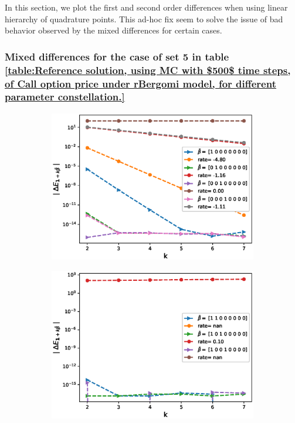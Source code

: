 \documentclass[11pt]{article}
\begin{document}
In this section, we plot the first and second order differences when using linear hierarchy of quadrature points. This ad-hoc fix seem to solve the issue of bad behavior observed by the mixed differences for certain cases.
\subsubsection{Mixed differences for the case of set 5 in table \ref{table:Reference solution, using MC with $500$ time steps, of Call option price under rBergomi model, for different parameter constellation.}}\label{Mixed differences for the case of set 5,linear}

\begin{figure}[h!]
	\centering
	
	\begin{subfigure}{.4\textwidth}
		\centering
		\includegraphics[width=1\linewidth]{./figures/rBergomi_mixed_error_rates/with_linear_hierarchy/N_4/H_002/first_difference_rbergomi_4steps_H_002_K_1_totally_hierarch_with_rate_W1}
		\caption{}
		\label{fig:sub3}
	\end{subfigure}%
	\begin{subfigure}{.4\textwidth}
		\centering
		\includegraphics[width=1\linewidth]{./figures/rBergomi_mixed_error_rates/with_linear_hierarchy/N_4/H_002/mixed_difference_order2_rbergomi_4steps_H_002_K_1_totally_hierarch_with_rate_W1}
		\caption{}
		\label{fig:sub3}
	\end{subfigure}%
	

\end{figure}
\end{document}
